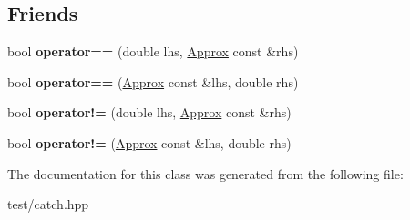 \subsection*{Friends}
\begin{DoxyCompactItemize}
\item 
bool {\bfseries operator==} (double lhs, \hyperlink{classCatch_1_1Detail_1_1Approx}{Approx} const \&rhs)\hypertarget{classCatch_1_1Detail_1_1Approx_ac766f044f1c63f0c5997982baefd9049}{}\label{classCatch_1_1Detail_1_1Approx_ac766f044f1c63f0c5997982baefd9049}

\item 
bool {\bfseries operator==} (\hyperlink{classCatch_1_1Detail_1_1Approx}{Approx} const \&lhs, double rhs)\hypertarget{classCatch_1_1Detail_1_1Approx_a35999631e6cef569f9da9f3fa910db22}{}\label{classCatch_1_1Detail_1_1Approx_a35999631e6cef569f9da9f3fa910db22}

\item 
bool {\bfseries operator!=} (double lhs, \hyperlink{classCatch_1_1Detail_1_1Approx}{Approx} const \&rhs)\hypertarget{classCatch_1_1Detail_1_1Approx_a83b3763569a7ecc143c335b630be0e47}{}\label{classCatch_1_1Detail_1_1Approx_a83b3763569a7ecc143c335b630be0e47}

\item 
bool {\bfseries operator!=} (\hyperlink{classCatch_1_1Detail_1_1Approx}{Approx} const \&lhs, double rhs)\hypertarget{classCatch_1_1Detail_1_1Approx_a7497ef839f8026cc0edd6269a80f3e09}{}\label{classCatch_1_1Detail_1_1Approx_a7497ef839f8026cc0edd6269a80f3e09}

\end{DoxyCompactItemize}


The documentation for this class was generated from the following file\+:\begin{DoxyCompactItemize}
\item 
test/catch.\+hpp\end{DoxyCompactItemize}
